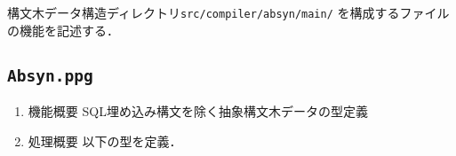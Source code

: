 \documentclass{jbook}
\newif\ifjp
\newcommand{\code}[1]{\mbox{\large\tt #1}}
\begin{document}
\ifjp%
	構文木データ構造ディレクトリ\code{src/compiler/absyn/main/}
を構成するファイルの機能を記述する．


\subsection{\code{Absyn.ppg}}
\begin{enumerate}
\item 機能概要 SQL埋め込み構文を除く抽象構文木データの型定義
\item 処理概要 
	以下の型を定義．


\end{enumerate}
\end{document}
